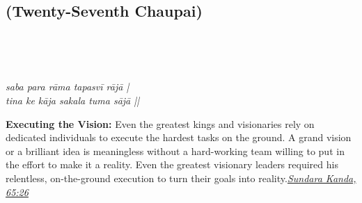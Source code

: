 
\newpage

\subsection*{ (Twenty-Seventh Chaupai)}

\begin{minipage}[t]{0.55\textwidth}
\vspace{0pt}

{\large \linespread{1.5}\selectfont
{}\\
\par}

\vspace{0.5em}

{\large \linespread{1.5}\selectfont
{}\\
\par}

\vspace{0.5em}

{\large \linespread{1.3}\selectfont
\textit{saba para rāma tapasvī rājā |}\\
\textit{tina ke kāja sakala tuma sājā ||}
\par}
\end{minipage}%
\hfill
\begin{minipage}[t]{0.42\textwidth}
\vspace{0pt}
\begin{tcolorbox}[anchorbox]
\textbf{Executing the Vision:} Even the greatest kings and visionaries rely on dedicated individuals to execute the hardest tasks on the ground. A grand vision or a brilliant idea is meaningless without a hard-working team willing to put in the effort to make it a reality.
\vspace{0.5em}\newline Even the greatest visionary leaders required his relentless, on-the-ground execution to turn their goals into reality.\newline\null\hfill\href{https://www.valmiki.iitk.ac.in/sloka?field_kanda_tid=5&language=dv&field_sarga_value=65}{\textit{Sundara Kanda, 65:26}}
\end{tcolorbox}
\end{minipage}


